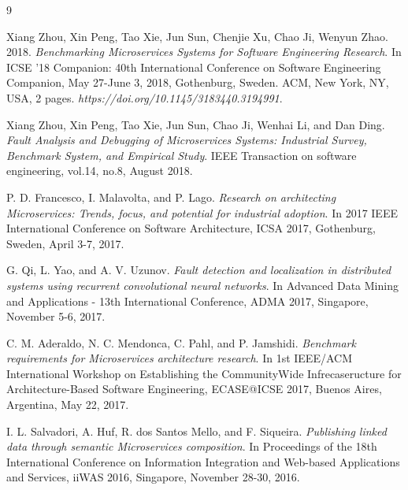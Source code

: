 \documentclass{uetgraduation}
\begin{document}
\begin{thebibliography}{9}
\begin{bibsection}{}
 Xiang Zhou, Xin Peng, Tao Xie, Jun Sun, Chenjie Xu, Chao Ji, Wenyun Zhao. 2018. \textit{Benchmarking Microservices Systems for Software Engineering Research}. In ICSE ’18 Companion: 40th International Conference on Software Engineering Companion, May 27-June 3, 2018, Gothenburg, Sweden. ACM, New York, NY, USA, 2 pages. \textit{https://doi.org/10.1145/3183440.3194991}.

 Xiang Zhou, Xin Peng, Tao Xie, Jun Sun, Chao Ji, Wenhai Li, and Dan Ding. \textit{Fault Analysis and Debugging of Microservices
Systems: Industrial Survey, Benchmark System, and Empirical Study}. IEEE Transaction on software engineering, vol.14, no.8, August 2018.

 P. D. Francesco, I. Malavolta, and P. Lago. \textit{Research on architecting Microservices: Trends, focus, and potential for industrial adoption}. In 2017 IEEE International Conference on Software Architecture, ICSA 2017, Gothenburg, Sweden, April 3-7, 2017.

 G. Qi, L. Yao, and A. V. Uzunov. \textit{Fault detection and localization in distributed systems using recurrent convolutional neural
networks}. In Advanced Data Mining and Applications - 13th International Conference, ADMA 2017, Singapore, November 5-6, 2017.

 C. M. Aderaldo, N. C. Mendonca, C. Pahl, and P. Jamshidi. \textit{Benchmark requirements for Microservices architecture research}. In 1st IEEE/ACM International Workshop on Establishing the CommunityWide Infrecaseructure for Architecture-Based Software Engineering, ECASE@ICSE 2017, Buenos Aires, Argentina, May 22, 2017.

 I. L. Salvadori, A. Huf, R. dos Santos Mello, and F. Siqueira. \textit{Publishing linked data through semantic Microservices composition}. In Proceedings of the 18th International Conference on Information Integration and Web-based Applications and Services, iiWAS 2016,
Singapore, November 28-30, 2016.
\end{bibsection}
\end{thebibliography}
\end{document}
